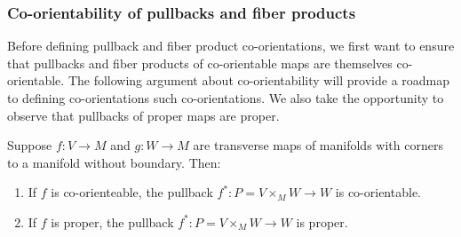 \begin{comment}
	BCOMMENT
	\red{Again, isn't the point that we don't know $\gamma$, so how can we fix the diagram to commute and then use that to determine $\gamma$? I think the idea is that we really need to say that the first diagram somehow determines this diagram via some conventions (what are those?).
		Then we know what the maps on the right are because that's just the tensor product of co-orientations of $V$ and $W$.
		On the left we know $i$ since that's canonical somehow (we still need to look up a good reference for that), and then all these other things determine a unique $\gamma$ so that the diagram commutes.
		This $\gamma$ is our co-orientation for $P$.
		So I think this all needs to be clarified.}
	Any such set of choices then yields
	a definition of pullback co-orientation through a diagram chase.
	In concrete terms, fix a local orientation $\beta_M$ of $M$, and then
	use the co-orientations of $f$ and $g$ to identify compatible local orientations $\beta_V$ of $V$ and $\beta_W$ of $W$.
	A fixed identification
	of the normal bundle of $\Delta M$ with the tangent bundle of $M$ then gives a $\beta_{\nu P \subset V \times W}$ which corresponds to $\beta_M$.
	The pullback co-orientation of the map $P \to M$ can then be defined pair $\beta_M$ with a
	local orientation $\beta_P$ of $P$ so that $\beta_P \otimes \beta_{\nu P \subset V \times W}$ maps to $\beta_V \otimes \beta_W$ under
	the top horizontal isomorphism of Equation~\ref{co-or stuff}.
	ECOMMENT

	In order to obtain these properties we will develop additional structure to control the
	isomorphisms in Diagram~\eqref{co-or stuff}.
	We do this first by working at the level of vector spaces and linear maps over a point before expanding to local definitions and then
	back to the global level.
\end{comment}

\subsubsection{Co-orientability of pullbacks and fiber products}

Before defining pullback and fiber product co-orientations, we first want to ensure that pullbacks and fiber products of co-orientable maps are themselves co-orientable.
The following argument about co-orientability will provide a roadmap to defining co-orientations such co-orientations.
We also take the opportunity to observe that pullbacks of proper maps are proper.

\begin{lemma}\label{L: co-orientable pullback}
	Suppose $f:V\to M$ and $g:W\to M$ are transverse maps of manifolds with corners to a manifold without boundary.
	Then:
	\begin{enumerate}
		\item If $f$ is co-orienteable, the pullback $f^*:P=V\times_MW\to W$ is co-orientable.

		\item If $f$ is proper, the pullback $f^*:P=V\times_MW\to W$ is proper.
	\end{enumerate}
\end{lemma}

